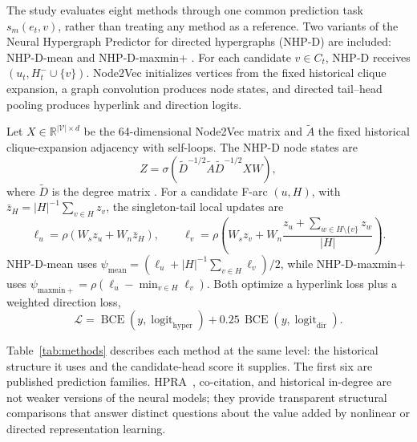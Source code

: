 \documentclass{svproc}
\newcommand{\Vcal}{\mathcal{V}}
\newcommand{\R}{\mathbb{R}}
\begin{document}
The study evaluates eight methods through one common prediction task $s_m(e_t,v)$, rather than treating any method as a reference. Two variants of the Neural Hypergraph Predictor for directed hypergraphs (NHP-D) are included: NHP-D-mean and NHP-D-maxmin+ \cite{yadati2020nhp}. For each candidate $v\in C_t$, NHP-D receives $(u_t,H_t^-\cup\{v\})$. Node2Vec \cite{grover2016node2vec} initializes vertices from the fixed historical clique expansion, a graph convolution produces node states, and directed tail--head pooling produces hyperlink and direction logits.

Let $X\in\R^{|\Vcal|\times d}$ be the 64-dimensional Node2Vec matrix and $\widetilde A$ the fixed historical clique-expansion adjacency with self-loops. The NHP-D node states are
\begin{equation}
Z=\sigma\!\left(\widetilde D^{-1/2}\widetilde A\widetilde D^{-1/2}XW\right),
\label{eq:gcn}
\end{equation}
where $\widetilde D$ is the degree matrix \cite{kipf2017semi}. For a candidate F-arc $(u,H)$, with $\bar z_H=|H|^{-1}\sum_{v\in H}z_v$, the singleton-tail local updates are
\begin{equation}
\ell_u=\rho(W_s z_u+W_n\bar z_H),\qquad
\ell_v=\rho\!\left(W_s z_v+W_n\frac{z_u+\sum_{w\in H\setminus\{v\}}z_w}{|H|}\right).
\label{eq:local}
\end{equation}
NHP-D-mean uses $\psi_{\mathrm{mean}}=(\ell_u+|H|^{-1}\sum_{v\in H}\ell_v)/2$, while NHP-D-maxmin+ uses $\psi_{\mathrm{maxmin+}}=\rho(\ell_u-\min_{v\in H}\ell_v)$. Both optimize a hyperlink loss plus a weighted direction loss,
\begin{equation}
\mathcal{L}=\operatorname{BCE}(y,\operatorname{logit}_{\mathrm{hyper}})+0.25\,\operatorname{BCE}(y,\operatorname{logit}_{\mathrm{dir}}).
\label{eq:nhpd-loss}
\end{equation}

Table~\ref{tab:methods} describes each method at the same level: the historical structure it uses and the candidate-head score it supplies. The first six are published prediction families. HPRA~\cite{kumar2020hpra}, co-citation, and historical in-degree are not weaker versions of the neural models; they provide transparent structural comparisons that answer distinct questions about the value added by nonlinear or directed representation learning.
\end{document}
